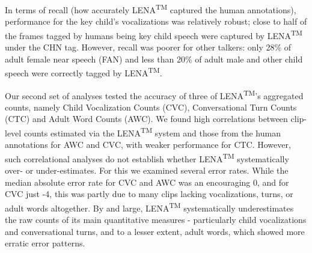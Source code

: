 \documentclass[english,floatsintext,man]{apa6}
\begin{document}
In terms of recall (how accurately LENA\textsuperscript{TM} captured the
human annotations), performance for the key child's vocalizations was
relatively robust; close to half of the frames tagged by humans being
key child speech were captured by LENA\textsuperscript{TM} under the CHN
tag. However, recall was poorer for other talkers: only 28\% of adult
female near speech (FAN) and less than 20\% of adult male and other
child speech were correctly tagged by LENA\textsuperscript{TM}.

Our second set of analyses tested the accuracy of three of
LENA\textsuperscript{TM}'s aggregated counts, namely Child Vocalization
Counts (CVC), Conversational Turn Counts (CTC) and Adult Word Counts
(AWC). We found high correlations between clip-level counts estimated
via the LENA\textsuperscript{TM} system and those from the human
annotations for AWC and CVC, with weaker performance for CTC. However,
such correlational analyses do not establish whether
LENA\textsuperscript{TM} systematically over- or under-estimates. For
this we examined several error rates. While the median absolute error
rate for CVC and AWC was an encouraging 0, and for CVC just -4, this was
partly due to many clips lacking vocalizations, turns, or adult words
altogether. By and large, LENA\textsuperscript{TM} systematically
underestimates the raw counts of its main quantitative measures -
particularly child vocalizations and conversational turns, and to a
lesser extent, adult words, which showed more erratic error patterns.
\end{document}
